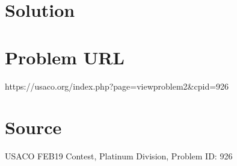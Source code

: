 \documentclass[12pt]{article}
\begin{document}
\section*{Solution}


\section*{Problem URL}
https://usaco.org/index.php?page=viewproblem2&cpid=926

\section*{Source}
USACO FEB19 Contest, Platinum Division, Problem ID: 926
\end{document}
